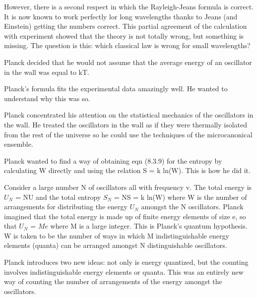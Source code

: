 \documentclass{../template/texnote}
\begin{document}
However, there is a second respect in which the Rayleigh-Jeans formula is correct. It is now known to work perfectly lor long wavelengths thanks to Jeans (and
Einstein) getting the numbers correct.  This partial agreement of the calculation
with experiment showed that the theory is not totally wrong, but something is
missing. The question is this: which classical law is wrong for small wavelengths? 

Planck decided that he would not assume that the average energy of an oscillator in the wall was equal to kT.

Planck's formula fits the experimental data amazingly
well. He wanted to understand why this was so. 

Planck concentrated his attention on
the statistical mechanics of the oscillators in the wall. He treated the oscillators
in the wall as if they were thermally isolated from the rest of the universe so he
could use the techniques of the microcanonical ensemble.

Planck wanted to
find a way of obtaining eqn (8.3.9) for the entropy by calculating W directly and
using the relation S = k ln(W). 
This is how he did it.


Consider a large number N of oscillators all with frequency v. The total 
energy is $U_N$ =  NU and the total entropy $S_N$ = NS = k ln(W) where W is the
number of arrangements for distributing the energy $U_N$ amongst the N 
oscillators. Planck imagined that the total energy is made up of finite energy elements
of size e, so that $U_N$ = $M e$ where M is a large integer. This is Planck's quantum
hypothesis. W is taken to be the number of ways in which M indistinguishable
energy elements (quanta) 
can be arranged amongst N distinguishable oscillators.


Planck introduces two new ideas: not only is energy quantized, but the 
counting involves indistinguishable energy elements or quanta. This was an entirely
new way of counting the number of arrangements of the energy amongst the
oscillators.
\end{document}
